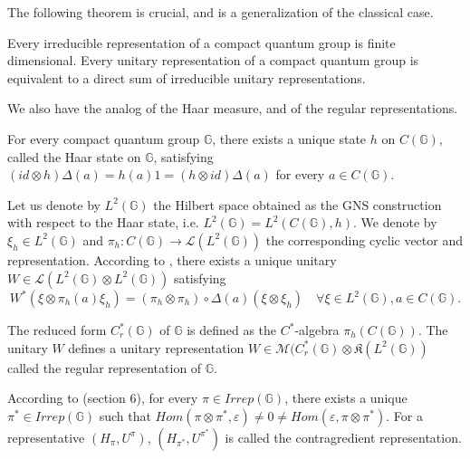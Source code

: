 The following theorem is crucial, and is a generalization of the classical case. 

\begin{thm} Every irreducible representation of a compact quantum group is finite dimensional. Every unitary representation of a compact quantum group is equivalent to a direct sum of irreducible unitary representations. 
\end{thm}
 
We also have the analog of the Haar measure, and of the regular representations.

\begin{prop}
For every compact quantum group $\mathbb G$, there exists a unique state $h$ on $C(\mathbb G)$, called the Haar state on $\mathbb G$, satisfying $(id\otimes h)\Delta(a) = h(a)1 = (h\otimes id)\Delta(a)$ for every $a\in C(\mathbb G)$. 
\end{prop}

Let us denote by $L^2(\mathbb G)$ the Hilbert space obtained as the GNS construction with respect to the Haar state, i.e. $L^2(\mathbb G) = L^2(C(\mathbb G),h)$. We denote by $\xi_h\in L^2(\mathbb G)$ and $\pi_h : C(\mathbb G)\rightarrow \mathcal L(L^2(\mathbb G))$ the corresponding cyclic vector and representation. According to \cite{Wo}, there exists a unique unitary $W\in \mathcal L(L^2(\mathbb G) \otimes L^2(\mathbb G) )$ satisfying 
\[W^*(\xi\otimes \pi_h(a)\xi_h ) = (\pi_h\otimes\pi_h)\circ \Delta(a)(\xi\otimes \xi_h)\quad \forall \xi\in L^2(\mathbb G),a\in C(\mathbb G).\] 

\begin{definition}
The reduced form $C_r^*(\mathbb G)$ of $\mathbb G$ is defined as the $C^*$-algebra $\pi_h(C(\mathbb G))$. The unitary $W$ defines a unitary representation $W\in\mathcal M(C_r^*(\mathbb G)\otimes \mathfrak K(L^2(\mathbb G))$ called the regular representation of $\mathbb G$.
\end{definition}

According to \cite{Wo} (section $6$), for every $\pi\in Irrep(\mathbb G)$, there exists a unique $\pi^*\in Irrep(\mathbb G)$ such that $Hom(\pi\otimes \pi^*,\varepsilon)\neq 0 \neq Hom(\varepsilon,\pi\otimes \pi^*) $. For a representative $(H_\pi,U^\pi)$, $(H_{\pi^*},U^{\pi^*})$ is called the contragredient representation.\\

